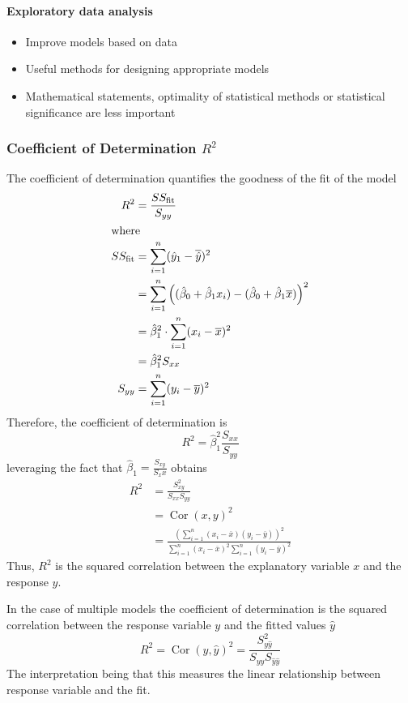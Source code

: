 \documentclass[11pt]{article}
\theoremstyle{definition}
\newcommand*\samplemean[1]{\overline{#1}}
\newcommand*\Cor[1]{\mathop{\text{Cor}}\left(#1\right)}
\begin{document}
\paragraph{Exploratory data analysis}
\begin{itemize}
	\item Improve models based on data
	\item Useful methods for designing appropriate models
	\item Mathematical statements, optimality of statistical methods or statistical significance are less important
\end{itemize}

\subsubsection{Coefficient of Determination $R^2$}
The coefficient of determination quantifies the goodness of the fit of the model
\begin{align*}
	R^2 &= \frac{SS_\text{fit}}{S_{yy}}\\
	\intertext{where}
	SS_\text{fit} &= \sum_{i=1}^{n} (\hat{y}_1 - \samplemean{\hat{y}})^2\\
	&= \sum_{i=1}^{n} \left( (\hat{\beta}_0 + \hat{\beta}_1 x_i) - (\hat{\beta}_0 + \hat{\beta}_1 \samplemean{x}) \right)^2\\
	&= \hat{\beta}_1^2 \cdot \sum_{i=1}^{n} (x_i - \samplemean{x})^2\\
	&= \hat{\beta}_1^2 S_{xx}\\
	S_{yy} &= \sum_{i=1}^{n} (y_i - \samplemean{y})^2
\end{align*}
Therefore, the coefficient of determination is
\begin{equation*}
	R^2 = \hat{\beta}_1^2 \frac{S_{xx}}{S_{yy}}
\end{equation*}
leveraging the fact that $\hat{\beta}_1 = \frac{S_{xy}}{S_xx}$ obtains
\begin{align*}
	R^2 &= \frac{S_{xy}^2}{S_{xx}S_{yy}}\\
	&= \Cor{x,y}^2\\
	&= \frac{\left(\sum_{i=1}^{n} (x_i - \samplemean{x})(y_i - \samplemean{y}) \right)^2}{\sum_{i=1}^{n}(x_i - \samplemean{x})^2 \sum_{i=1}^{n}(y_i - \samplemean{y})^2}
\end{align*}
Thus, $R^2$ is the squared correlation between the explanatory variable $x$ and the response $y$.

In the case of multiple models the coefficient of determination is the squared correlation between the response variable $y$ and the fitted values $\hat{y}$
\begin{equation*}
	R^2 = \Cor{y,\hat{y}}^2 = \frac{S_{y\hat{y}}^2}{S_{yy}S_{\hat{y}\hat{y}}}
\end{equation*}
The interpretation being that this measures the linear relationship between response variable and the fit.
\end{document}

